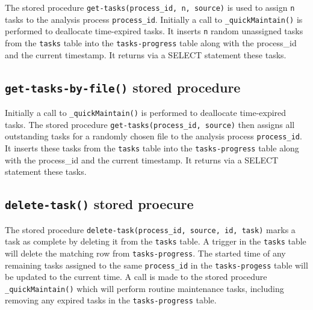 \documentclass[
]{book}
\begin{document}
The stored procedure \texttt{get-tasks(process\_id,\ n,\ source)} is used to assign \texttt{n} tasks to the analysis process \texttt{process\_id}. Initially a call to \texttt{\_quickMaintain()} is performed to deallocate time-expired tasks. It inserts \texttt{n} random unassigned tasks from the \texttt{tasks} table into the \texttt{tasks-progress} table along with the process\_id and the current timestamp. It returns via a SELECT statement these tasks.

\hypertarget{get-tasks-by-file-stored-procedure}{%
\subsection{\texorpdfstring{\texttt{get-tasks-by-file()} stored procedure}{get-tasks-by-file() stored procedure}}\label{get-tasks-by-file-stored-procedure}}

Initially a call to \texttt{\_quickMaintain()} is performed to deallocate time-expired tasks. The stored procedure \texttt{get-tasks(process\_id,\ source)} then assigns all outstanding tasks for a randomly chosen file to the analysis process \texttt{process\_id}. It inserts these tasks from the \texttt{tasks} table into the \texttt{tasks-progress} table along with the process\_id and the current timestamp. It returns via a SELECT statement these tasks.

\hypertarget{delete-task-stored-proecure}{%
\subsection{\texorpdfstring{\texttt{delete-task()} stored proecure}{delete-task() stored proecure}}\label{delete-task-stored-proecure}}

The stored procedure \texttt{delete-task(process\_id,\ source,\ id,\ task)} marks a task as complete by deleting it from the \texttt{tasks} table. A trigger in the \texttt{tasks} table will delete the matching row from \texttt{tasks-progress}. The started time of any remaining tasks assigned to the same \texttt{process\_id} in the \texttt{tasks-progess} table will be updated to the current time. A call is made to the stored procedure \texttt{\_quickMaintain()} which will perform routine maintenance tasks, including removing any expired tasks in the \texttt{tasks-progress} table.

  
\end{document}
